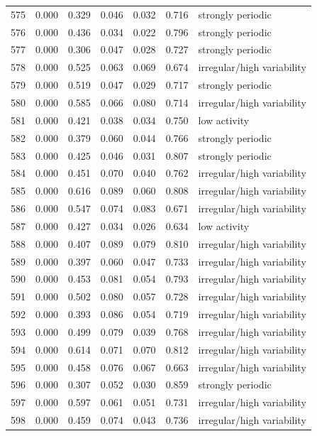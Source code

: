 \begin{longtable}{lrrrrrl}
575 & 0.000 & 0.329 & 0.046 & 0.032 & 0.716 & strongly periodic \\
576 & 0.000 & 0.436 & 0.034 & 0.022 & 0.796 & strongly periodic \\
577 & 0.000 & 0.306 & 0.047 & 0.028 & 0.727 & strongly periodic \\
578 & 0.000 & 0.525 & 0.063 & 0.069 & 0.674 & irregular/high variability \\
579 & 0.000 & 0.519 & 0.047 & 0.029 & 0.717 & strongly periodic \\
580 & 0.000 & 0.585 & 0.066 & 0.080 & 0.714 & irregular/high variability \\
581 & 0.000 & 0.421 & 0.038 & 0.034 & 0.750 & low activity \\
582 & 0.000 & 0.379 & 0.060 & 0.044 & 0.766 & strongly periodic \\
583 & 0.000 & 0.425 & 0.046 & 0.031 & 0.807 & strongly periodic \\
584 & 0.000 & 0.451 & 0.070 & 0.040 & 0.762 & irregular/high variability \\
585 & 0.000 & 0.616 & 0.089 & 0.060 & 0.808 & irregular/high variability \\
586 & 0.000 & 0.547 & 0.074 & 0.083 & 0.671 & irregular/high variability \\
587 & 0.000 & 0.427 & 0.034 & 0.026 & 0.634 & low activity \\
588 & 0.000 & 0.407 & 0.089 & 0.079 & 0.810 & irregular/high variability \\
589 & 0.000 & 0.397 & 0.060 & 0.047 & 0.733 & irregular/high variability \\
590 & 0.000 & 0.453 & 0.081 & 0.054 & 0.793 & irregular/high variability \\
591 & 0.000 & 0.502 & 0.080 & 0.057 & 0.728 & irregular/high variability \\
592 & 0.000 & 0.393 & 0.086 & 0.054 & 0.719 & irregular/high variability \\
593 & 0.000 & 0.499 & 0.079 & 0.039 & 0.768 & irregular/high variability \\
594 & 0.000 & 0.614 & 0.071 & 0.070 & 0.812 & irregular/high variability \\
595 & 0.000 & 0.458 & 0.076 & 0.067 & 0.663 & irregular/high variability \\
596 & 0.000 & 0.307 & 0.052 & 0.030 & 0.859 & strongly periodic \\
597 & 0.000 & 0.597 & 0.061 & 0.051 & 0.731 & irregular/high variability \\
598 & 0.000 & 0.459 & 0.074 & 0.043 & 0.736 & irregular/high variability \\

\end{longtable}
